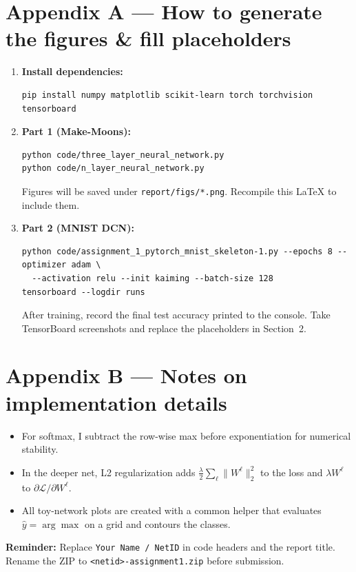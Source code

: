 \documentclass[11pt]{article}
\begin{document}
\section*{Appendix A --- How to generate the figures \& fill placeholders}
\begin{enumerate}[leftmargin=1.2em]
  \item \textbf{Install dependencies:}
\begin{verbatim}
pip install numpy matplotlib scikit-learn torch torchvision tensorboard
\end{verbatim}
  \item \textbf{Part 1 (Make-Moons):}
\begin{verbatim}
python code/three_layer_neural_network.py
python code/n_layer_neural_network.py
\end{verbatim}
  Figures will be saved under \texttt{report/figs/*.png}. Recompile this \LaTeX{} to include them.
  \item \textbf{Part 2 (MNIST DCN):}
\begin{verbatim}
python code/assignment_1_pytorch_mnist_skeleton-1.py --epochs 8 --optimizer adam \
  --activation relu --init kaiming --batch-size 128
tensorboard --logdir runs
\end{verbatim}
  After training, record the final test accuracy printed to the console. Take TensorBoard screenshots and replace the placeholders in Section~2.
\end{enumerate}

\section*{Appendix B --- Notes on implementation details}
\begin{itemize}[leftmargin=1.2em]
  \item For softmax, I subtract the row-wise max before exponentiation for numerical stability.
  \item In the deeper net, L2 regularization adds \( \frac{\lambda}{2}\sum_\ell \|W^\ell\|_2^2 \) to the loss and \( \lambda W^\ell \) to \( \partial \mathcal{L}/\partial W^\ell \).
  \item All toy-network plots are created with a common helper that evaluates \(\hat{y}=\arg\max\) on a grid and contours the classes.
\end{itemize}

\vspace{1em}
\noindent\textbf{Reminder:} Replace \texttt{Your Name / NetID} in code headers and the report title. Rename the ZIP to \texttt{<netid>-assignment1.zip} before submission.
\end{document}
